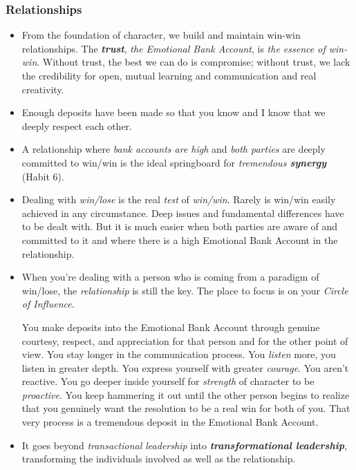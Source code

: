 \documentclass[11pt]{article}
\begin{document}
\subsubsection{Relationships}
\begin{itemize}
\item From the foundation of character, we build and maintain win-win relationships. The \emph{\textbf{trust}}, \emph{the Emotional Bank Account}, is \emph{the essence of win-win}. Without trust, the best we can do is compromise; without trust, we lack the credibility for open, mutual learning and communication and real creativity.

\item Enough deposits have been made so that you know and I know that we deeply respect each other. 

\item A relationship where \emph{bank accounts are high} and \emph{both parties} are deeply committed to win/win is the ideal springboard for \emph{tremendous \textbf{synergy}} (Habit 6). 

\item Dealing with \emph{win/lose} is the real \emph{test} of \emph{win/win}. Rarely is win/win easily achieved in any circumstance. Deep issues and fundamental differences have to be dealt with. But it is much easier when both parties are aware of and committed to it and where there is a high Emotional Bank Account in the relationship.

\item When you're dealing with a person who is coming from a paradigm of win/lose, the \emph{relationship} is still the key. The place to focus is on your \emph{Circle of Influence}. 

You make deposits into the Emotional Bank Account through genuine courtesy, respect, and appreciation for that person and for the other point of view. You stay longer in the communication process. You \emph{listen} more, you listen in greater depth. You express yourself with greater \emph{courage}. You aren't reactive. You go deeper inside yourself for \emph{strength} of character to be \emph{proactive}. You keep hammering it out until the other person begins to realize that you genuinely want the resolution to be a real win for both of you. That very process is a tremendous deposit in the Emotional Bank Account.

\item It goes beyond \emph{transactional leadership} into \emph{\textbf{transformational leadership}}, transforming the individuals involved as well as the relationship.


\end{itemize}
\end{document}
